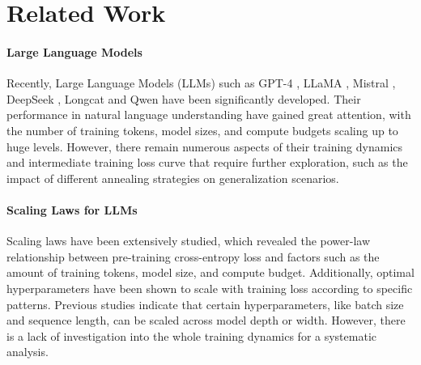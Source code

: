 \documentclass[letterpaper]{article} %
\begin{document}
\section{Related Work}

\paragraph{Large Language Models}
Recently, Large Language Models (LLMs) such as GPT-4 \citep{achiam2023gpt}, LLaMA \citep{touvron2023llama}, Mistral \citep{jiang2023mistral}, DeepSeek \cite{bi2024deepseek, guo2025deepseek}, Longcat \cite{team2025longcat,chen2025mathematical,chen2025can} and Qwen \citep{yang2025qwen3technicalreport} have been significantly developed. Their performance in natural language understanding have gained great attention, with the number of training tokens, model sizes, and compute budgets scaling up to huge levels. However, there remain numerous aspects of their training dynamics and intermediate training loss curve that require further exploration, such as the impact of different annealing strategies on generalization scenarios.

\paragraph{Scaling Laws for LLMs}
Scaling laws \citep{Kaplan2020ScalingLF, Hoffmann2022TrainingCL} have been extensively studied, which revealed the power-law relationship between pre-training cross-entropy loss and factors such as the amount of training tokens, model size, and compute budget. Additionally, optimal hyperparameters \citep{mccandlish2018empirical, Hu2024MiniCPMUT, Li2024SurgePI} have been shown to scale with training loss according to specific patterns. Previous studies \citep{Yang2022TensorPV, Yang2023TensorPV,chen2025revisiting} indicate that certain hyperparameters, like batch size and sequence length, can be scaled across model depth or width. However, there is a lack of investigation into the whole training dynamics for a systematic analysis.
\end{document}
